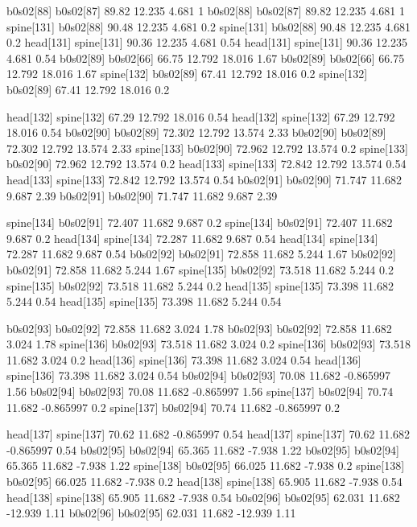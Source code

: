 b0s02[88]    b0s02[87]    89.82    12.235    4.681    1
b0s02[88]    b0s02[87]    89.82    12.235    4.681    1
spine[131]    b0s02[88]    90.48    12.235    4.681    0.2
spine[131]    b0s02[88]    90.48    12.235    4.681    0.2
head[131]    spine[131]    90.36    12.235    4.681    0.54
head[131]    spine[131]    90.36    12.235    4.681    0.54
b0s02[89]    b0s02[66]    66.75    12.792    18.016    1.67
b0s02[89]    b0s02[66]    66.75    12.792    18.016    1.67
spine[132]    b0s02[89]    67.41    12.792    18.016    0.2
spine[132]    b0s02[89]    67.41    12.792    18.016    0.2


head[132]    spine[132]    67.29    12.792    18.016    0.54
head[132]    spine[132]    67.29    12.792    18.016    0.54
b0s02[90]    b0s02[89]    72.302    12.792    13.574    2.33
b0s02[90]    b0s02[89]    72.302    12.792    13.574    2.33
spine[133]    b0s02[90]    72.962    12.792    13.574    0.2
spine[133]    b0s02[90]    72.962    12.792    13.574    0.2
head[133]    spine[133]    72.842    12.792    13.574    0.54
head[133]    spine[133]    72.842    12.792    13.574    0.54
b0s02[91]    b0s02[90]    71.747    11.682    9.687    2.39
b0s02[91]    b0s02[90]    71.747    11.682    9.687    2.39


spine[134]    b0s02[91]    72.407    11.682    9.687    0.2
spine[134]    b0s02[91]    72.407    11.682    9.687    0.2
head[134]    spine[134]    72.287    11.682    9.687    0.54
head[134]    spine[134]    72.287    11.682    9.687    0.54
b0s02[92]    b0s02[91]    72.858    11.682    5.244    1.67
b0s02[92]    b0s02[91]    72.858    11.682    5.244    1.67
spine[135]    b0s02[92]    73.518    11.682    5.244    0.2
spine[135]    b0s02[92]    73.518    11.682    5.244    0.2
head[135]    spine[135]    73.398    11.682    5.244    0.54
head[135]    spine[135]    73.398    11.682    5.244    0.54


b0s02[93]    b0s02[92]    72.858    11.682    3.024    1.78
b0s02[93]    b0s02[92]    72.858    11.682    3.024    1.78
spine[136]    b0s02[93]    73.518    11.682    3.024    0.2
spine[136]    b0s02[93]    73.518    11.682    3.024    0.2
head[136]    spine[136]    73.398    11.682    3.024    0.54
head[136]    spine[136]    73.398    11.682    3.024    0.54
b0s02[94]    b0s02[93]    70.08    11.682    -0.865997    1.56
b0s02[94]    b0s02[93]    70.08    11.682    -0.865997    1.56
spine[137]    b0s02[94]    70.74    11.682    -0.865997    0.2
spine[137]    b0s02[94]    70.74    11.682    -0.865997    0.2


head[137]    spine[137]    70.62    11.682    -0.865997    0.54
head[137]    spine[137]    70.62    11.682    -0.865997    0.54
b0s02[95]    b0s02[94]    65.365    11.682    -7.938    1.22
b0s02[95]    b0s02[94]    65.365    11.682    -7.938    1.22
spine[138]    b0s02[95]    66.025    11.682    -7.938    0.2
spine[138]    b0s02[95]    66.025    11.682    -7.938    0.2
head[138]    spine[138]    65.905    11.682    -7.938    0.54
head[138]    spine[138]    65.905    11.682    -7.938    0.54
b0s02[96]    b0s02[95]    62.031    11.682    -12.939    1.11
b0s02[96]    b0s02[95]    62.031    11.682    -12.939    1.11


